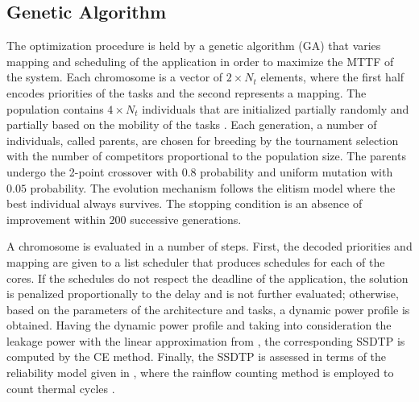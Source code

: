\subsection{Genetic Algorithm}
The optimization procedure is held by a genetic algorithm (GA) \cite{schmitz2004} that varies mapping and scheduling of the application in order to maximize the MTTF of the system. Each chromosome is a vector of $2 \times N_t$ elements, where the first half encodes priorities of the tasks and the second represents a mapping. The population contains $4 \times N_t$ individuals that are initialized partially randomly and partially based on the mobility of the tasks \cite{schmitz2004}. Each generation, a number of individuals, called parents, are chosen for breeding by the tournament selection with the number of competitors proportional to the population size. The parents undergo the 2-point crossover with $0.8$ probability and uniform mutation with $0.05$ probability. The evolution mechanism follows the elitism model where the best individual always survives. The stopping condition is an absence of improvement within $200$ successive generations.

A chromosome is evaluated in a number of steps. First, the decoded priorities and mapping are given to a list scheduler that produces schedules for each of the cores. If the schedules do not respect the deadline of the application, the solution is penalized proportionally to the delay and is not further evaluated; otherwise, based on the parameters of the architecture and tasks, a dynamic power profile is obtained. Having the dynamic power profile and taking into consideration the leakage power with the linear approximation from , the corresponding SSDTP is computed by the CE method. Finally, the SSDTP is assessed in terms of the reliability model given in , where the rainflow counting method is employed to count thermal cycles \cite{xiang2010}.
